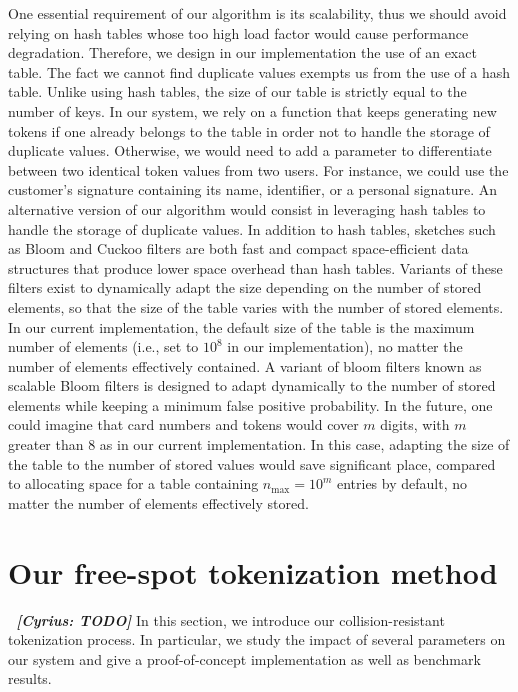 \documentclass{llncs}
\newcounter{prob}
\newcommand{\cn}[1]{\emph{\bf \color{purple}~[Cyrius: #1]}}
\begin{document}
One essential requirement of our algorithm is its scalability, thus we should avoid relying on hash tables whose too high load factor would cause performance degradation. Therefore, we design in our implementation the use of an exact table. The fact we cannot find duplicate values exempts us from the use of a hash table. Unlike using hash tables, the size of our table is strictly equal to the number of keys. In our system, we rely on a function that keeps generating new tokens if one already belongs to the table in order not to handle the storage of duplicate values. Otherwise, we would need to add a parameter to differentiate between two identical token values from two users. For instance, we could use the customer's signature containing its name, identifier, or a personal signature. An alternative version of our algorithm would consist in leveraging hash tables to handle the storage of duplicate values. In addition to hash tables, sketches such as Bloom and Cuckoo filters are both fast and compact space-efficient data structures that produce lower space overhead than hash tables.
Variants of these filters exist to dynamically adapt the size depending on the number of stored elements, so that the size of the table varies with the number of stored elements. In our current implementation, the default size of the table is the maximum number of elements (i.e., set to $10^8$ in our implementation), no matter the number of elements effectively contained. A variant of bloom filters known as scalable Bloom filters \cite{Almeida2007} is designed to adapt dynamically to the number of stored elements while keeping a minimum false positive probability. In the future, one could imagine that card numbers and tokens would cover $m$ digits, with $m$ greater than 8 as in our current implementation. In this case, adapting the size of the table to the number of stored values would save significant place, compared to allocating space for a table containing $n_{\max} = 10^m$ entries by default, no matter the number of elements effectively stored.

\section{Our free-spot tokenization method}\label{sect:method}

\cn{TODO}
In this section, we introduce our collision-resistant tokenization process. In particular, we study the impact of several parameters on our system and give a proof-of-concept implementation as well as benchmark results.
\end{document}
